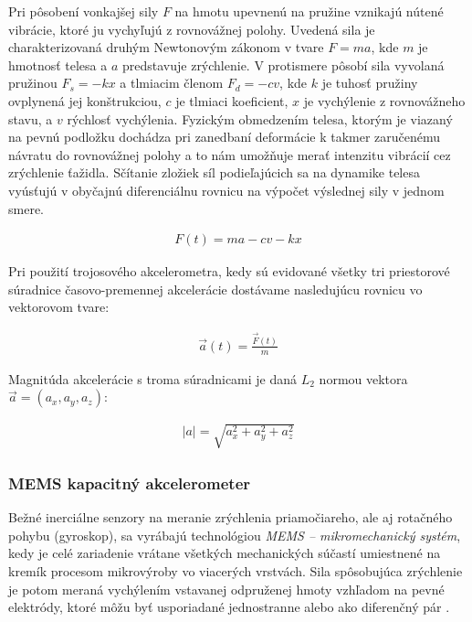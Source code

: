 Pri pôsobení vonkajšej sily $F$ na hmotu upevnenú na pružine vznikajú nútené vibrácie, ktoré ju vychyľujú z rovnovážnej polohy. Uvedená sila je charakterizovaná druhým Newtonovým zákonom v tvare $F = ma$, kde $m$ je hmotnosť telesa a $a$ predstavuje zrýchlenie. V protismere pôsobí sila vyvolaná pružinou $F_s = -kx$ a tlmiacim členom $F_d = -cv$, kde $k$ je tuhosť pružiny ovplynená jej konštrukciou, $c$ je tlmiaci koeficient, $x$ je vychýlenie z rovnovážneho stavu, a $v$ rýchlosť vychýlenia. Fyzickým obmedzením  telesa, ktorým je viazaný na pevnú podložku dochádza pri zanedbaní deformácie k takmer zaručenému návratu do rovnovážnej polohy a to nám umožňuje merať intenzitu vibrácií cez zrýchlenie ťažidla. Sčítanie zložiek síl podieľajúcich sa na dynamike telesa vyúsťujú v obyčajnú diferenciálnu rovnicu na výpočet výslednej sily v jednom smere.
\begin{ceqn}\begin{align}
 	F(t) = ma - cv - kx
\end{align}\end{ceqn}
Pri použití trojosového akcelerometra, kedy sú evidované všetky tri priestorové súradnice časovo-premennej akcelerácie dostávame 
nasledujúcu rovnicu vo vektorovom tvare: 
\begin{ceqn}\begin{align}
   \vec{a}(t) = \frac{\vec{F}(t)}{m}
\end{align}\end{ceqn}
Magnitúda akcelerácie s troma súradnicami je daná $L_2$ normou vektora $\vec{a} = (a_x, a_y, a_z)$:
\begin{ceqn}\begin{align}
   |a| = \sqrt{a_x^2 + a_y^2 + a_z^2}
\end{align}\end{ceqn}

\subsubsection{MEMS kapacitný akcelerometer}
Bežné inerciálne senzory na meranie zrýchlenia priamočiareho, ale aj rotačného pohybu (gyroskop), sa vyrábajú technológiou 
\emph{MEMS – mikromechanický systém}, kedy je celé zariadenie vrátane všetkých mechanických súčastí umiestnené na kremík procesom 
mikrovýroby vo viacerých vrstvách. Sila spôsobujúca zrýchlenie je potom meraná vychýlením vstavanej odpruženej hmoty vzhľadom 
na pevné elektródy, ktoré môžu byť usporiadané jednostranne alebo ako diferenčný pár \cite{mdof-mems-accelerometers}.

